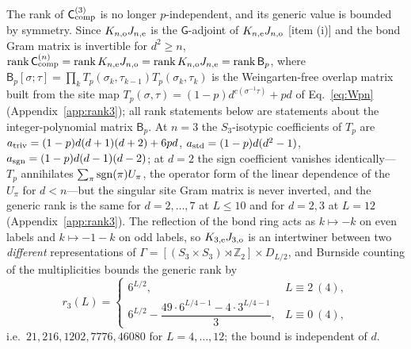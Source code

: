 \documentclass[aps,prx,reprint,superscriptaddress,nobibnotes,longbibliography]{revtex4-2}
\theoremstyle{remark}
\newcommand{\rk}{\operatorname{rank}}
\newcommand{\Ccomp}{\mathsf C_{\rm comp}}
\begin{document}
The rank of $\Ccomp^{(3)}$ is no longer $p$-independent, and its generic value is bounded by symmetry.  Since $K_{n,{\rm o}}J_{n,{\rm e}}$ is the $\mathsf G$-adjoint of $K_{n,{\rm e}}J_{n,{\rm o}}$ [item (i)] and the bond Gram matrix is invertible for $d^2\ge n$, $\rk\Ccomp^{(n)}=\rk K_{n,{\rm e}}J_{n,{\rm o}}=\rk K_{n,{\rm o}}J_{n,{\rm e}}=\rk\mathsf B_p$, where $\mathsf B_p[\sigma;\tau]=\prod_kT_p(\sigma_k,\tau_{k-1})T_p(\sigma_k,\tau_k)$ is the Weingarten-free overlap matrix built from the site map $T_p(\sigma,\tau)=(1-p)d^{c(\sigma^{-1}\tau)}+pd$ of Eq.~\eqref{eq:Wpn} (Appendix~\ref{app:rank3}); all rank statements below are statements about the integer-polynomial matrix $\mathsf B_p$.  At $n=3$ the $S_3$-isotypic coefficients of $T_p$ are $a_{\rm triv}=(1-p)d(d+1)(d+2)+6pd$, $a_{\rm std}=(1-p)d(d^2-1)$, $a_{\rm sgn}=(1-p)d(d-1)(d-2)$; at $d=2$ the sign coefficient vanishes identically---$T_p$ annihilates $\sum_\pi{\rm sgn}(\pi)U_\pi$, the operator form of the linear dependence of the $U_\pi$ for $d<n$---but the singular site Gram matrix is never inverted, and the generic rank is the same for $d=2,\ldots,7$ at $L\le10$ and for $d=2,3$ at $L=12$ (Appendix~\ref{app:rank3}).  The reflection of the bond ring acts as $k\mapsto-k$ on even labels and $k\mapsto-1-k$ on odd labels, so $K_{3,{\rm e}}J_{3,{\rm o}}$ is an intertwiner between two \emph{different} representations of $\Gamma=[(S_3\times S_3)\rtimes\mathbb Z_2]\times D_{L/2}$, and Burnside counting of the multiplicities bounds the generic rank by
\begin{equation}
 r_3(L)=\begin{cases}6^{L/2}, & L\equiv2\ (4),\\[3pt] 6^{L/2}-\dfrac{49\cdot6^{L/4-1}-4\cdot3^{L/4-1}}{3}, & L\equiv0\ (4),\end{cases}
 \label{eq:rank3}
\end{equation}
i.e.\ $21,216,1202,7776,46080$ for $L=4,\ldots,12$; the bound is independent of $d$.
\end{document}
